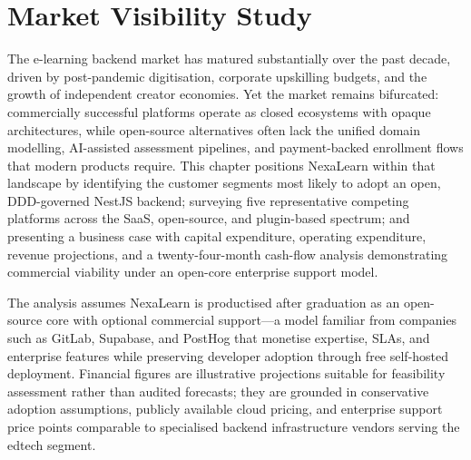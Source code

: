 
\chapter{Market Visibility Study}
\label{ch:market-study}

The e-learning backend market has matured substantially over the past decade, driven by post-pandemic digitisation, corporate upskilling budgets, and the growth of independent creator economies. Yet the market remains bifurcated: commercially successful platforms operate as closed ecosystems with opaque architectures, while open-source alternatives often lack the unified domain modelling, AI-assisted assessment pipelines, and payment-backed enrollment flows that modern products require. This chapter positions NexaLearn within that landscape by identifying the customer segments most likely to adopt an open, DDD-governed NestJS backend; surveying five representative competing platforms across the SaaS, open-source, and plugin-based spectrum; and presenting a business case with capital expenditure, operating expenditure, revenue projections, and a twenty-four-month cash-flow analysis demonstrating commercial viability under an open-core enterprise support model.

The analysis assumes NexaLearn is productised after graduation as an open-source core with optional commercial support---a model familiar from companies such as GitLab, Supabase, and PostHog that monetise expertise, SLAs, and enterprise features while preserving developer adoption through free self-hosted deployment. Financial figures are illustrative projections suitable for feasibility assessment rather than audited forecasts; they are grounded in conservative adoption assumptions, publicly available cloud pricing, and enterprise support price points comparable to specialised backend infrastructure vendors serving the edtech segment.




